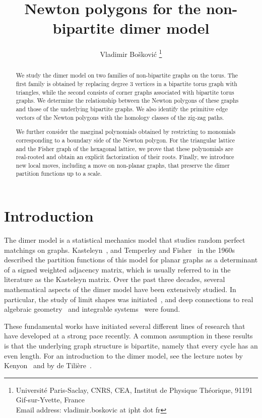 \documentclass[12pt,a4paper]{article}
\title{Newton polygons for the non-bipartite dimer model}
\author{Vladimir Bo\v skovi\'c \thanks{Universit\'e Paris-Saclay, CNRS, CEA, Institut de Physique Th\'eorique, 91191 Gif-sur-Yvette, France\\Email address: vladimir.boskovic at ipht dot fr}}
\theoremstyle{definition}
\begin{document}
\maketitle

\begin{abstract}
    We study the dimer model on two families of non-bipartite graphs on the torus. The first family is obtained by replacing degree $3$ vertices in a bipartite torus graph with triangles, while the second consists of corner graphs associated with bipartite torus graphs. We determine the relationship between the Newton polygons of these graphs and those of the underlying bipartite graphs. We also identify the primitive edge vectors of the Newton polygons with the homology classes of the zig-zag paths.

    We further consider the marginal polynomials obtained by restricting to monomials corresponding to a boundary side of the Newton polygon. For the triangular lattice and the Fisher graph of the hexagonal lattice, we prove that these polynomials are real-rooted and obtain an explicit factorization of their roots. Finally, we introduce new local moves, including a move on non-planar graphs, that preserve the dimer partition functions up to a scale.
\end{abstract}

\section{Introduction}

The dimer model is a statistical mechanics model that studies random perfect matchings on graphs. Kasteleyn~\cite{Kasteleyn63}, and Temperley and Fisher~\cite{TemperleyFisher61} in the 1960s described the partition functions of this model for planar graphs as a determinant of a signed weighted adjacency matrix, which is usually referred to in the literature as the Kasteleyn matrix. Over the past three decades, several mathematical aspects of the dimer model have been extensively studied. In particular, the study of limit shapes was initiated~\cite{CKP01}, and deep connections to real algebraic geometry~\cite{KO06, KOS06} and integrable systems~\cite{GoncharovKenyon} were found. 

These fundamental works have initiated several different lines of research that have developed at a strong pace recently. A common assumption in these results is that the underlying graph structure is bipartite, namely that every cycle has an even length. For an introduction to the dimer model, see the lecture notes by Kenyon~\cite{KenyonLectureNotes} and by de Tilière~\cite{deTiliere2015}. 
\end{document}
